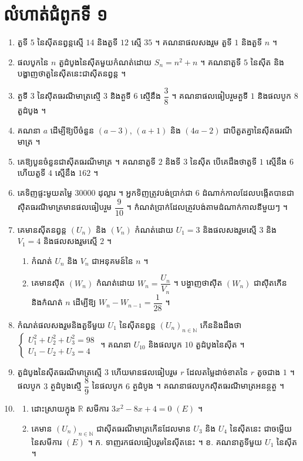 \section*{លំហាត់ជំពូកទី ១}
\begin{enumerate}[1]
  \item តួទី $5$ នៃស៊ីតនព្វន្តស្មើ $14$ និងតួទី $12$ ស្មើ $35$ ។ គណនាផលសងរួម តួទី $1$ និងតួទី $n$ ។
  \item ផលបូកនៃ $n$ តួដំបូងនៃស៊ីតមួយកំណត់ដោយ $S_n = n^2 + n$ ។ គណនាតួទី $5$ នៃស៊ីត និងបង្ហាញថាតួនៃស៊ីតនេះជាស៊ីតនព្វន្ត ។
  \item តួទី $3$ នៃស៊ីតធរណីមាត្រស្មើ $3$ និងតួទី $6$ ស្មើនឹង $\dfrac{3}{8}$ ។ គណនាផលធៀបរួមតួទី $1$ និងផលបូក $8$ តួដំបូង ។
  \item គណនា $a$ ដើម្បីឱ្យបីចំនួន $(a - 3)$, $(a + 1)$ និង $(4a - 2)$ ជាបីតួតគ្នានៃស៊ីតធរណីមាត្រ ។
  \item គេឱ្យបួនចំនួនជាស៊ីតធរណីមាត្រ ។ គណនាតួទី $2$ និងទី $3$ នៃស៊ីត បើគេដឹងថាតួទី $1$ ស្មើនឹង $6$ ហើយតួទី $4$ ស្មើនឹង $162$ ។
  \item គេទិញផ្ទះមួយតម្លៃ $30000$ ដុល្លារ ។ អ្នកទិញត្រូវបង់ប្រាក់ជា $6$ ដំណាក់កាលដែលបង្កើតបានជាស៊ីតធរណីមាត្រមានផលធៀបរួម $\dfrac{9}{10}$ ។ កំណត់ប្រាក់ដែលត្រូវបង់តាមដំណាក់កាលនីមួយៗ ។
  \item គេមានស៊ីតនព្វន្ត $(U_n)$ និង $(V_n)$ កំណត់ដោយ $U_1 = 3$ និងផលសងរួមស្មើ $3$ និង $V_1 = 4$ និងផលសងរួមស្មើ $2$ ។
  \begin{enumerate}[a]
    \item កំណត់ $U_n$ និង $V_n$ ជាអនុគមន៍នៃ $n$ ។
    \item គេមានស៊ីត $(W_n)$ កំណត់ដោយ $W_n = \dfrac{U_n}{V_n}$ ។ បង្ហាញថាស៊ីត $(W_n)$ ជាស៊ីតកើន និងកំណត់ $n$ ដើម្បីឱ្យ $W_n - W_{n-1} = \dfrac{1}{28}$ ។
  \end{enumerate}
  \item កំណត់ផលសងរួមនិងតួទីមួយ $U_1$ នៃស៊ីតនព្វន្ត $(U_n)_{n \in \mathbb{N}}$ កើននិងដឹងថា $\begin{cases} U_1^2 + U_2^2 + U_3^2 = 98\\ U_1 - U_2 + U_3 = 4 \end{cases}$ ។ គណនា $U_{10}$ និងផលបូក $10$ តួដំបូងនៃស៊ីត ។
  \item តួដំបូងនៃស៊ីតធរណីមាត្រស្មើ $3$ ហើយមានផលធៀបរួម $r$ ដែលតម្លៃដាច់ខាតនៃ $r$ តូចជាង $1$ ។ ផលបូក $3$ តួដំបូងស្មើ $\dfrac{8}{9}$ នៃផលបូក $6$ តួដំបូង ។ គណនាផលបូកស៊ីតធរណីមាត្រអនន្តតួ ។
  \item \begin{enumerate}[1]
    \item ដោះស្រាយក្នុង $\mathbb{R}$ សមីការ $3x^2 - 8x + 4 = 0$ $(E)$ ។
    \item គេមាន $(U_n)_{n \in \mathbb{N}}$ ជាស៊ីតធរណីមាត្រកើនដែលមាន $U_3$ និង $U_4$ នៃស៊ីតនេះ ជាចម្លើយនៃសមីការ $(E)$ ។ ក. ទាញរកផលធៀបរួមនៃស៊ីតនេះ ។ ខ. គណនាតួទីមួយ $U_1$ នៃស៊ីត ។
  \end{enumerate}
\end{enumerate}

